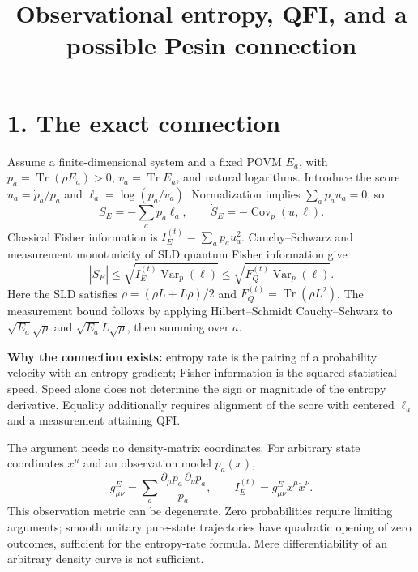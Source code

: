\documentclass[11pt,a4paper]{article}
\DeclareMathOperator{\Tr}{Tr}
\DeclareMathOperator{\Var}{Var}
\DeclareMathOperator{\Cov}{Cov}
\begin{document}
\title{Observational entropy, QFI, and a possible Pesin connection}
\author{}
\date{}
\maketitle
\section*{1. The exact connection}
Assume a finite-dimensional system and a fixed POVM $E_a$, with $p_a=\Tr(\rho E_a)>0$, $v_a=\Tr E_a$, and natural logarithms. Introduce the score $u_a=\dot p_a/p_a$ and $\ell_a=\log(p_a/v_a)$. Normalization implies $\sum_ap_au_a=0$, so
\[S_E=-\sum_ap_a\ell_a,\qquad\dot S_E=-\Cov_p(u,\ell).\]
Classical Fisher information is $I_E^{(t)}=\sum_ap_au_a^2$. Cauchy--Schwarz and measurement monotonicity of SLD quantum Fisher information give
\[\boxed{|\dot S_E|\le\sqrt{I_E^{(t)}\Var_p(\ell)}\le\sqrt{F_Q^{(t)}\Var_p(\ell)}.}\]
Here the SLD satisfies $\dot\rho=(\rho L+L\rho)/2$ and $F_Q^{(t)}=\Tr(\rho L^2)$. The measurement bound follows by applying Hilbert--Schmidt Cauchy--Schwarz to $\sqrt{E_a}\sqrt\rho$ and $\sqrt{E_a}L\sqrt\rho$, then summing over $a$.

\textbf{Why the connection exists:} entropy rate is the pairing of a probability velocity with an entropy gradient; Fisher information is the squared statistical speed. Speed alone does not determine the sign or magnitude of the entropy derivative. Equality additionally requires alignment of the score with centered $\ell_a$ and a measurement attaining QFI.

The argument needs no density-matrix coordinates. For arbitrary state coordinates $x^\mu$ and an observation model $p_a(x)$,
\[g^E_{\mu\nu}=\sum_a\frac{\partial_\mu p_a\,\partial_\nu p_a}{p_a},\qquad I_E^{(t)}=g^E_{\mu\nu}\dot x^\mu\dot x^\nu.\]
This observation metric can be degenerate. Zero probabilities require limiting arguments; smooth unitary pure-state trajectories have quadratic opening of zero outcomes, sufficient for the entropy-rate formula. Mere differentiability of an arbitrary density curve is not sufficient.
\end{document}

